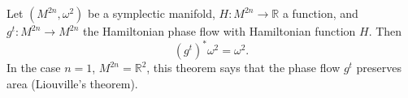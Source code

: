 Let $(M^{2n}, \omega^2)$ be a symplectic manifold, $H: M^{2n} \to \mathbb{R}$ a function, and $g^t: M^{2n} \to M^{2n}$ the Hamiltonian phase flow with Hamiltonian function $H$. Then
$$
(g^t)^* \omega^2 = \omega^2.
$$
In the case $n = 1$, $M^{2n} = \mathbb{R}^2$, this theorem says that the phase flow $g^t$ preserves area (Liouville's theorem).
